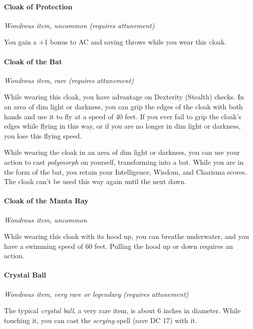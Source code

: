 \documentclass[
]{article}
\begin{document}
\hypertarget{cloak-of-protection}{%
\paragraph{Cloak of Protection}\label{cloak-of-protection}}

\emph{Wondrous item, uncommon (requires attunement)}

You gain a +1 bonus to AC and saving throws while you wear this cloak.

\hypertarget{cloak-of-the-bat}{%
\paragraph{Cloak of the Bat}\label{cloak-of-the-bat}}

\emph{Wondrous item, rare (requires attunement)}

While wearing this cloak, you have advantage on Dexterity (Stealth)
checks. In an area of dim light or darkness, you can grip the edges of
the cloak with both hands and use it to fly at a speed of 40 feet. If
you ever fail to grip the cloak's edges while flying in this way, or if
you are no longer in dim light or darkness, you lose this flying speed.

While wearing the cloak in an area of dim light or darkness, you can use
your action to cast \emph{polymorph} on yourself, transforming into a
bat. While you are in the form of the bat, you retain your Intelligence,
Wisdom, and Charisma scores. The cloak can't be used this way again
until the next dawn.

\hypertarget{cloak-of-the-manta-ray}{%
\paragraph{Cloak of the Manta Ray}\label{cloak-of-the-manta-ray}}

\emph{Wondrous item, uncommon}

While wearing this cloak with its hood up, you can breathe underwater,
and you have a swimming speed of 60 feet. Pulling the hood up or down
requires an action.

\hypertarget{crystal-ball}{%
\paragraph{Crystal Ball}\label{crystal-ball}}

\emph{Wondrous item, very rare or legendary (requires attunement)}

The typical \emph{crystal ball}, a very rare item, is about 6 inches in
diameter. While touching it, you can cast the \emph{scrying} spell (save
DC 17) with it.
\end{document}
